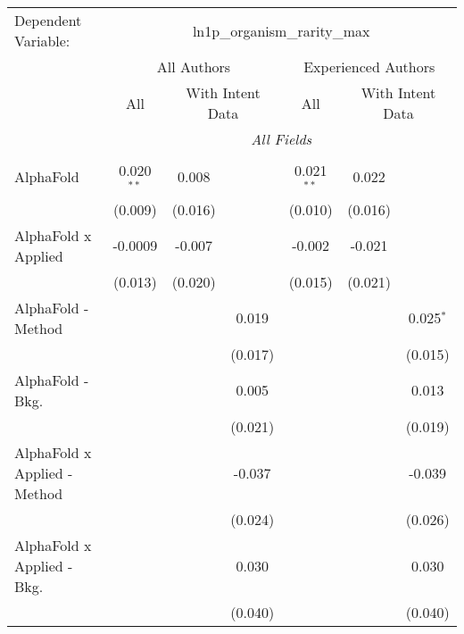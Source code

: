\begingroup
\centering
\begin{tabular}{lcccccc}
   \tabularnewline \midrule \midrule
   Dependent Variable: & \multicolumn{6}{c}{ln1p\_organism\_rarity\_max}\\
 & \multicolumn{3}{c}{All Authors} & \multicolumn{3}{c}{Experienced Authors} \\
\cmidrule(lr){2-4} \cmidrule(lr){5-7}
 & \multicolumn{1}{c}{All} & \multicolumn{2}{c}{With Intent Data} & \multicolumn{1}{c}{All} & \multicolumn{2}{c}{With Intent Data} \\
\cmidrule(lr){2-2} \cmidrule(lr){3-4} \cmidrule(lr){5-5} \cmidrule(lr){6-7}
 & \multicolumn{6}{c}{\textit{All Fields}} \\ \\
   AlphaFold                      & 0.020$^{**}$ & 0.008         &               & 0.021$^{**}$ & 0.022        &   \\   
                                  & (0.009)      & (0.016)       &               & (0.010)      & (0.016)      &   \\   
   AlphaFold x Applied            & -0.0009      & -0.007        &               & -0.002       & -0.021       &   \\   
                                  & (0.013)      & (0.020)       &               & (0.015)      & (0.021)      &   \\   
   AlphaFold - Method             &              &               & 0.019         &              &              & 0.025$^{*}$\\   
                                  &              &               & (0.017)       &              &              & (0.015)\\   
   AlphaFold - Bkg.               &              &               & 0.005         &              &              & 0.013\\   
                                  &              &               & (0.021)       &              &              & (0.019)\\   
   AlphaFold x Applied - Method   &              &               & -0.037        &              &              & -0.039\\   
                                  &              &               & (0.024)       &              &              & (0.026)\\   
   AlphaFold x Applied - Bkg.     &              &               & 0.030         &              &              & 0.030\\   
                                  &              &               & (0.040)       &              &              & (0.040)\\   

\end{tabular}
